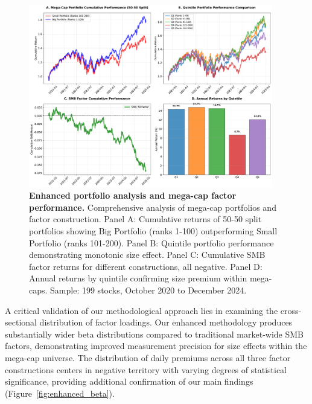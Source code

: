 \documentclass[10pt,letterpaper]{article}
\begin{document}
\begin{figure}[!h]
\centering
\includegraphics[width=0.95\textwidth]{figures/fig_enhanced_portfolio_analysis.pdf}
\caption{\textbf{Enhanced portfolio analysis and mega-cap factor performance.}
Comprehensive analysis of mega-cap portfolios and factor construction. Panel A: Cumulative returns of 50-50 split portfolios showing Big Portfolio (ranks 1-100) outperforming Small Portfolio (ranks 101-200). Panel B: Quintile portfolio performance demonstrating monotonic size effect. Panel C: Cumulative SMB factor returns for different constructions, all negative. Panel D: Annual returns by quintile confirming size premium within mega-caps. Sample: 199 stocks, October 2020 to December 2024.}
\label{fig:enhanced_portfolio}
\end{figure}

A critical validation of our methodological approach lies in examining the cross-sectional distribution of factor loadings. Our enhanced methodology produces substantially wider beta distributions compared to traditional market-wide SMB factors, demonstrating improved measurement precision for size effects within the mega-cap universe. The distribution of daily premiums across all three factor constructions centers in negative territory with varying degrees of statistical significance, providing additional confirmation of our main findings (Figure~\ref{fig:enhanced_beta}).
\end{document}
